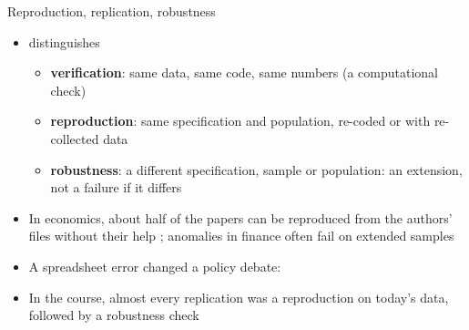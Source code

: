 \begin{frame}{Reproduction, replication, robustness}
\itemsize{\small}
\begin{itemize}
    \item {} distinguishes
    \begin{itemize}
        \item \textbf{verification}: same data, same code, same numbers (a computational check)
        \item \textbf{reproduction}: same specification and population, re-coded or with re-collected data
        \item \textbf{robustness}: a different specification, sample or population: an extension, not a failure if it differs
    \end{itemize}
    \item In economics, about half of the papers can be reproduced from the authors' files without their help ; anomalies in finance often fail on extended samples 
    \item A spreadsheet error changed a policy debate: 
    \item In the course, almost every replication was a reproduction on today's data, followed by a robustness check
\end{itemize}
\end{frame}

